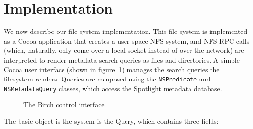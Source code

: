 \documentclass{article}
\begin{document}
\section{Implementation}

We now describe our file system implementation. This file system is
implemented as a Cocoa application that creates a user-space NFS
system, and NFS RPC calls (which, naturally, only come over a local
socket instead of over the network) are interpreted to render metadata
search queries as files and directories. A simple Cocoa user interface
(shown in figure~\ref{figure:mainwindow}) manages the search queries
the filesystem renders. Queries are composed using the
\texttt{NSPredicate} and \texttt{NSMetadataQuery} classes, which
access the Spotlight metadata database.

\begin{figure}[ht!]
  \begin{center}
    \caption{The Birch control interface.}
    \label{figure:mainwindow}
  \end{center}
\end{figure}

The basic object is the system is the Query, which contains three
fields:
\end{document}
